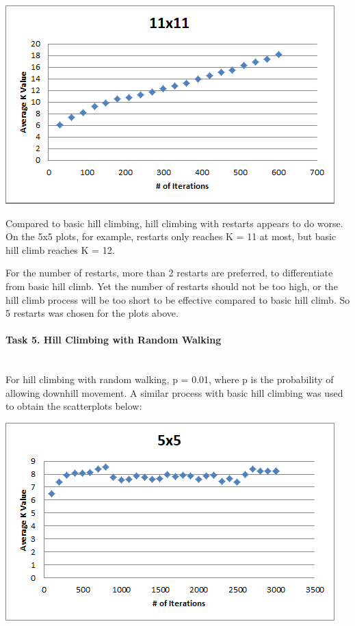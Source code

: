 \documentclass[12pt, letterpaper]{article}
\begin{document}
\includegraphics[width=\linewidth]{"Task 4/11x11 Scatterplot"}

Compared to basic hill climbing, hill climbing with restarts appears to do worse. On the 5x5 plots, for example, restarts only reaches K = 11 at most, but basic hill climb reaches K = 12.

For the number of restarts, more than 2 restarts are preferred, to differentiate from basic hill climb. Yet the number of restarts should not be too high, or the hill climb process will be too short to be effective compared to basic hill climb. So 5 restarts was chosen for the plots above.

\pagebreak
\paragraph{Task 5. Hill Climbing with Random Walking} \mbox{}\\

For hill climbing with random walking, p = 0.01, where p is the probability of allowing downhill movement. A similar process with basic hill climbing was used to obtain the scatterplots below:

\includegraphics[width=\linewidth]{"Task 5/5x5 Scatterplot"}
\end{document}
